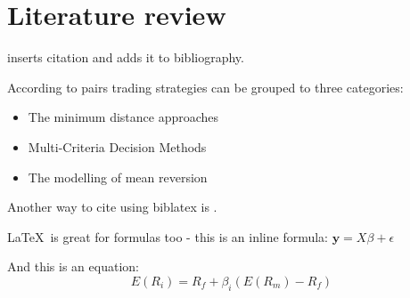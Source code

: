 \section{Literature review}

\cite{focardiNewApproachStatistical2016} inserts citation and adds it to bibliography. 

According to \textcite{huckPairsTradingSelection2015} pairs trading strategies can be grouped to three categories:
\vspace{-5mm}
\begin{itemize}[noitemsep]
  \item The minimum distance approaches
  \item Multi-Criteria Decision Methods
  \item The modelling of mean reversion 
\end{itemize}


Another way to cite using biblatex is \parencite{huckPairsTradingOutranking2010}. 


\LaTeX \ is great for formulas too - this is an inline formula: $\textbf{y} = X\beta  + \epsilon $

And this is an equation: \\
\begin{equation}
  E(R_i) =  R_f + \beta_i (E(R_m) - R_f)
\end{equation}